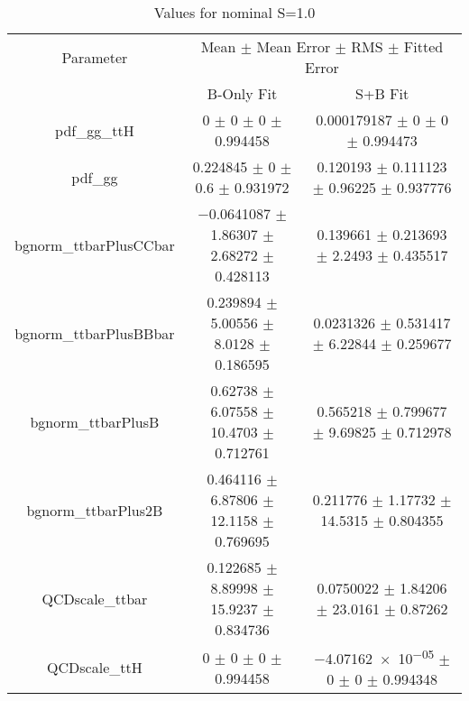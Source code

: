 \begin{table}
\centering
\caption{Values for nominal S=1.0}
\begin{tabular}{ccc}
\toprule
Parameter & \multicolumn{2}{c}{Mean $\pm$ Mean Error $\pm$ RMS $\pm$ Fitted Error}\\
 & B-Only Fit & S+B Fit\\
\midrule
pdf\_gg\_ttH & \num{0} $\pm$ \num{0} $\pm$ \num{0} $\pm$ \num{0.994458} & \num{0.000179187} $\pm$ \num{0} $\pm$ \num{0} $\pm$ \num{0.994473}\\
pdf\_gg & \num{0.224845} $\pm$ \num{0} $\pm$ \num{0.6} $\pm$ \num{0.931972} & \num{0.120193} $\pm$ \num{0.111123} $\pm$ \num{0.96225} $\pm$ \num{0.937776}\\
bgnorm\_ttbarPlusCCbar & \num{-0.0641087} $\pm$ \num{1.86307} $\pm$ \num{2.68272} $\pm$ \num{0.428113} & \num{0.139661} $\pm$ \num{0.213693} $\pm$ \num{2.2493} $\pm$ \num{0.435517}\\
bgnorm\_ttbarPlusBBbar & \num{0.239894} $\pm$ \num{5.00556} $\pm$ \num{8.0128} $\pm$ \num{0.186595} & \num{0.0231326} $\pm$ \num{0.531417} $\pm$ \num{6.22844} $\pm$ \num{0.259677}\\
bgnorm\_ttbarPlusB & \num{0.62738} $\pm$ \num{6.07558} $\pm$ \num{10.4703} $\pm$ \num{0.712761} & \num{0.565218} $\pm$ \num{0.799677} $\pm$ \num{9.69825} $\pm$ \num{0.712978}\\
bgnorm\_ttbarPlus2B & \num{0.464116} $\pm$ \num{6.87806} $\pm$ \num{12.1158} $\pm$ \num{0.769695} & \num{0.211776} $\pm$ \num{1.17732} $\pm$ \num{14.5315} $\pm$ \num{0.804355}\\
QCDscale\_ttbar & \num{0.122685} $\pm$ \num{8.89998} $\pm$ \num{15.9237} $\pm$ \num{0.834736} & \num{0.0750022} $\pm$ \num{1.84206} $\pm$ \num{23.0161} $\pm$ \num{0.87262}\\
QCDscale\_ttH & \num{0} $\pm$ \num{0} $\pm$ \num{0} $\pm$ \num{0.994458} & \num{-4.07162e-05} $\pm$ \num{0} $\pm$ \num{0} $\pm$ \num{0.994348}\\
\bottomrule
\end{tabular}
\end{table}